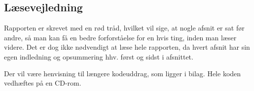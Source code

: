 \subsection{Læsevejledning}
Rapporten er skrevet med en rød tråd, hvilket vil sige, at nogle afsnit er sat før andre, så man kan få en bedre forforståelse for en hvis ting, inden man læser videre. Det er dog ikke nødvendigt at læse hele rapporten, da hvert afsnit har sin egen indledning og opsummering hhv. først og sidst i afsnittet.

Der vil være henvisning til længere kodeuddrag, som ligger i bilag. Hele koden vedhæftes på en CD-rom.




